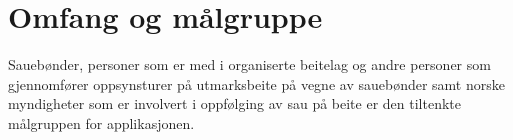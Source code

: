 \chapter{Omfang og målgruppe}
Sauebønder, personer som er med i organiserte beitelag og andre personer som gjennomfører oppsynsturer på utmarksbeite på vegne av sauebønder samt norske myndigheter som er involvert i oppfølging av sau på beite er den tiltenkte målgruppen for applikasjonen. 
